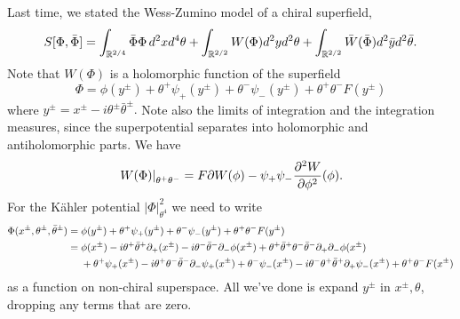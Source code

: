 Last time, we stated the Wess-Zumino model of a chiral superfield, 
\begin{equation}
    S[\Phi,\bar \Phi]=\int_{\mathbb{R}^{2/4}} \bar \Phi \Phi \, d^2x d^4 \theta + \int_{\mathbb{R}^{2/2}} W(\Phi)d^2y d^2\theta + \int_{\mathbb{R}^{2/2}} \bar W(\bar \Phi)d^2 \bar y d^2 \bar \theta.
\end{equation}
Note that $W(\Phi)$ is a holomorphic function of the superfield
\begin{equation}
    \Phi=\phi(y^\pm)+\theta^+ \psi_+(y^\pm)+\theta^- \psi_-(y^\pm) + \theta^+ \theta^- F(y^\pm)
\end{equation}
where $y^\pm=x^\pm -i\theta^\pm \bar \theta^\pm.$ Note also the limits of integration and the integration measures, since the superpotential separates into holomorphic and antiholomorphic parts. We have
\begin{equation}
    \left.W(\Phi)\right|_{\theta^+\theta^-} = F\partial W(\phi)-\psi_+ \psi_- \frac{\partial^2 W}{\partial \phi^2}(\phi).
\end{equation}
For the K\"ahler potential $|\Phi|^2_{\theta^4}$ we need to write
\begin{align}
    \Phi(x^\pm, \theta^\pm, \bar \theta^\pm) ={}&\phi(y^\pm) +\theta^+\psi_+(y^\pm) +\theta^- \psi_- (y^\pm) + \theta^+ \theta^- F(y^\pm)\\
        ={}& \phi(x^\pm) - i\theta^+ \bar \theta^+ \partial_+ (x^\pm) - i\theta^- \bar \theta^- \partial_- \phi(x^\pm) +\theta^+ \bar \theta^+ \theta^- \bar \theta^- \partial_+ \partial_- \phi(x^\pm)\\
        &+ \theta^+ \psi_+(x^\pm) -i\theta^+ \theta^- \bar \theta^- \partial_- \psi_+ (x^\pm) + \theta^- \psi_- (x^\pm) - i\theta^- \theta^+ \bar \theta^+ \partial_+ \psi_- (x^\pm) + \theta^+ \theta^- F(x^\pm)
\end{align}
as a function on non-chiral superspace. All we've done is expand $y^\pm$ in $x^\pm,\theta$, dropping any terms that are zero.


